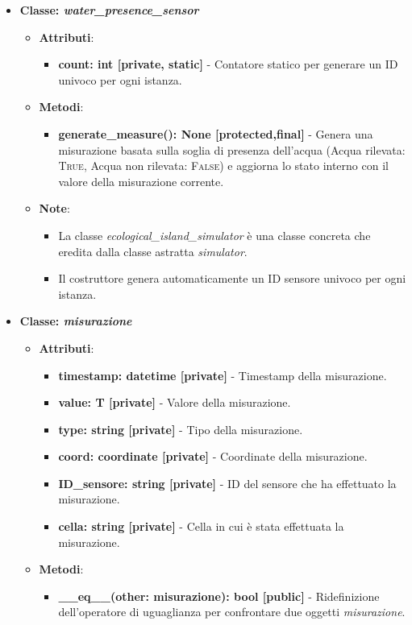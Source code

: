 \begin{itemize}
    \item{\textbf{Classe: \textit{water\_presence\_sensor}}}
    \begin{itemize}
        \item \textbf{Attributi}: 
        \begin{itemize}
            \item \textbf{count: int [private, static]} - Contatore statico per generare un ID univoco per ogni istanza.
        \end{itemize}
        \item \textbf{Metodi}: 
        \begin{itemize}
            \item \textbf{generate\_measure(): None [protected,final]} - Genera una misurazione basata sulla soglia di presenza dell'acqua (Acqua rilevata: \textsc{True}, Acqua non rilevata: \textsc{False}) e aggiorna lo stato interno con il valore della misurazione corrente.
        \end{itemize}
        \item \textbf{Note}:
        \begin{itemize}
            \item La classe \textit{ecological\_island\_simulator} è una classe concreta che eredita dalla classe astratta \textit{simulator}.
            \item Il costruttore genera automaticamente un ID sensore univoco per ogni istanza.
        \end{itemize}
    \end{itemize}

    \item{\textbf{Classe: \textit{misurazione}}}
    \begin{itemize}
        \item \textbf{Attributi}: 
        \begin{itemize}
            \item \textbf{timestamp: datetime [private]} - Timestamp della misurazione.
            \item \textbf{value: T [private]} - Valore della misurazione.
            \item \textbf{type: string [private]} - Tipo della misurazione.
            \item \textbf{coord: coordinate [private]} - Coordinate della misurazione.
            \item \textbf{ID\_sensore: string [private]} - ID del sensore che ha effettuato la misurazione.
            \item \textbf{cella: string [private]} - Cella in cui è stata effettuata la misurazione.
        \end{itemize}
        \item \textbf{Metodi}: 
        \begin{itemize}
            \item \textbf{\_\_eq\_\_(other: misurazione): bool [public]} - Ridefinizione dell'operatore di uguaglianza per confrontare due oggetti \textit{misurazione}.
        \end{itemize}
    \end{itemize}


\end{itemize}
